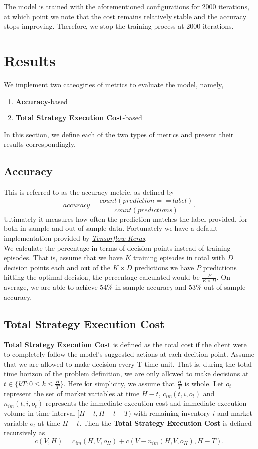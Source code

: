 \documentclass[12pt]{extarticle}
\begin{document}
\noindent The model is trained with the aforementioned configurations for 2000 iterations,
at which point we note that the cost remains relatively stable and the accuracy stops
improving. Therefore, we stop the training process at 2000 iterations.

\section{Results} \label{results}

We implement two cateogiries of metrics to evaluate the model, namely,
\begin{enumerate}
  \item \textbf{Accuracy}-based
  \item \textbf{Total Strategy Execution Cost}-based
\end{enumerate}
In this section, we define each of the two types of metrics and present their results correspondingly.

\subsection{Accuracy}
This is referred to as the accuracy metric, as defined by
$$\textit{accuracy} = \frac{\textit{count}(\textit{prediction} == \textit{label})}{\textit{count}(\textit{predictions})}.$$
Ultimately it measures how often the prediction matches the label provided, for both in-sample and out-of-sample data.
Fortunately we have a default implementation provided by
\href{https://github.com/tensorflow/tensorflow/blob/r1.13/tensorflow/python/ops/metrics_impl.py}{\textit{Tensorflow Keras}}. \\


\noindent We calculate the percentage in terms of decision points instead of training episodes. That is,
assume that we have $K$ training episodes in total with $D$ decision points each and
out of the $K \times D$ predictions we have $P$ predictions hitting the optimal decision,
the percentage calculated would be $\frac{P}{K \times D}$. On average, we are able to achieve
$54\%$ in-sample accuracy and $53\%$ out-of-sample accuracy.


\subsection{Total Strategy Execution Cost} \label{tsec}
\textbf{Total Strategy Execution Cost} is defined as the total cost if the client were to
completely follow the model's suggested actions at each decition point. Assume that
we are allowed to make decision every T time unit. That is, during the total time horizon
of the problem definition, we are only allowed to make decisions at $t \in \{ kT: 0 \le k \le \frac{H}{T} \}$.
Here for simplicity, we assume that $\frac{H}{T}$ is whole. Let $o_t$ represent the set
of market variables at time $H - t$, $c_{im}(t, i, o_t)$ and $n_{im}(t, i, o_t)$ represents the immediate execution cost and
immediate execution volume in time interval $[H-t, H-t+T)$ with remaining inventory $i$ and market variable $o_t$ at time $H - t$.
Then the \textbf{Total Strategy Execution Cost} is defined recursively as
$$c(V, H) = c_{im}(H, V, o_H) + c(V - n_{im}(H, V, o_H), H - T).$$
\end{document}
